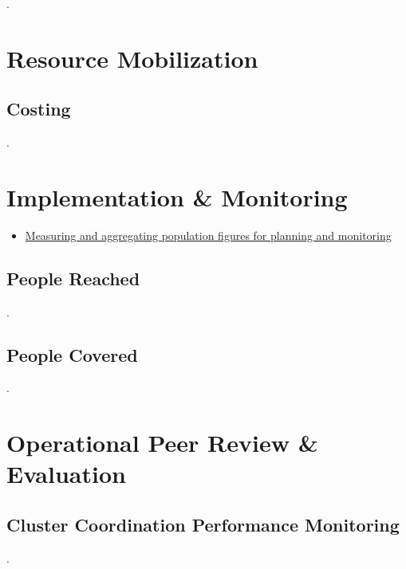 \documentclass[
  a4paper,
  onecolumn,
  oneside]{book}
\providecommand{\tightlist}{%
  \setlength{\itemsep}{0pt}\setlength{\parskip}{0pt}}\usepackage{longtable,booktabs,array}
\begin{document}
.

\hypertarget{resource-mobilization}{%
\chapter{Resource Mobilization}\label{resource-mobilization}}

\hypertarget{costing}{%
\section{Costing}\label{costing}}

.

\hypertarget{implementation-monitoring}{%
\chapter{Implementation \& Monitoring}\label{implementation-monitoring}}

\begin{tcolorbox}[enhanced jigsaw, colframe=quarto-callout-tip-color-frame, title=\textcolor{quarto-callout-tip-color}{\faLightbulb}\hspace{0.5em}{Recommended reading}, toptitle=1mm, toprule=.15mm, colbacktitle=quarto-callout-tip-color!10!white, breakable, arc=.35mm, coltitle=black, bottomrule=.15mm, titlerule=0mm, opacityback=0, rightrule=.15mm, bottomtitle=1mm, leftrule=.75mm, left=2mm, opacitybacktitle=0.6, colback=white]

\begin{itemize}
\tightlist
\item
  \href{files/OCHA\%20Approaches\%20to\%20determining\%20people\%20reached\%202022.pdf}{Measuring
  and aggregating population figures for planning and monitoring}
\end{itemize}

\end{tcolorbox}

\hypertarget{people-reached}{%
\section{People Reached}\label{people-reached}}

.

\hypertarget{people-covered}{%
\section{People Covered}\label{people-covered}}

.

\hypertarget{operational-peer-review-evaluation}{%
\chapter{Operational Peer Review \&
Evaluation}\label{operational-peer-review-evaluation}}

\hypertarget{cluster-coordination-performance-monitoring}{%
\section{Cluster Coordination Performance
Monitoring}\label{cluster-coordination-performance-monitoring}}

.


\backmatter
\end{document}
